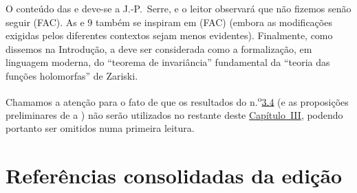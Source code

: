 O conteúdo das \hyperref[section:III.1]{} e \hyperref[section:III.2]{} deve-se a J.-P.~Serre, e o leitor observará que não fizemos senão seguir (FAC).
As  e 9 também se inspiram em (FAC) (embora as modificações exigidas pelos diferentes contextos sejam menos evidentes).
Finalmente, como dissemos na Introdução, a \hyperref[section:III.4]{} deve ser considerada como a formalização, em linguagem moderna, do ``teorema de invariância'' fundamental da ``teoria das funções holomorfas'' de Zariski.

Chamamos a atenção para o fato de que os resultados do n.\textsuperscript{o}\hyperref[subsection:III.3.4]{3.4} (e as proposições preliminares de  a ) não serão utilizados no restante deste \hyperref[section:ega3]{Capítulo~III}, podendo portanto ser omitidos numa primeira leitura.
\bigskip







\clearpage
{}
{}
\section*{Referências consolidadas da edição}
\nocite{*}




